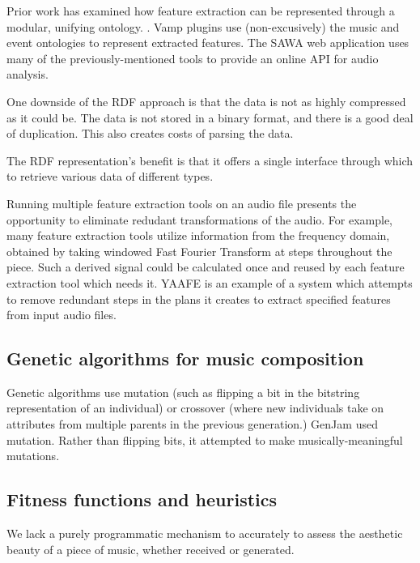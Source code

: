 \documentclass[11pt,conference,letterpaper]{IEEEtran}
\begin{document}
Prior work has examined how feature extraction can be represented through a modular, unifying ontology. \cite{raimond2008web}. Vamp plugins use (non-excusively) the music \cite{raimond2007music} and event \cite{raimond2007event} ontologies to represent extracted features. The SAWA web application \cite{fazekas2009reusable} uses many of the previously-mentioned tools to provide an online API for audio analysis.

One downside of the RDF approach is that the data is not as highly compressed as it could be. The data is not stored in a binary format, and there is a good deal of duplication. This also creates costs of parsing the data.

The RDF representation's benefit is that it offers a single interface through which to retrieve various data of different types.

Running multiple feature extraction tools on an audio file presents the opportunity to eliminate redudant transformations of the audio. For example, many feature extraction tools utilize information from the frequency domain, obtained by taking windowed Fast Fourier Transform at steps throughout the piece. Such a derived signal could be calculated once and reused by each feature extraction tool which needs it. YAAFE \cite{mathieu2010yaafe} is an example of a system which attempts to remove redundant steps in the plans it creates to extract specified features from input audio files.

\subsection{Genetic algorithms for music composition}

Genetic algorithms use mutation (such as flipping a bit in the bitstring representation of an individual) or crossover (where new individuals take on attributes from multiple parents in the previous generation.) GenJam used mutation. Rather than flipping bits, it attempted to make musically-meaningful mutations.


\subsection{Fitness functions and heuristics}

We lack a purely programmatic mechanism to accurately to assess the aesthetic beauty of a piece of music, whether received or generated.
\end{document}
